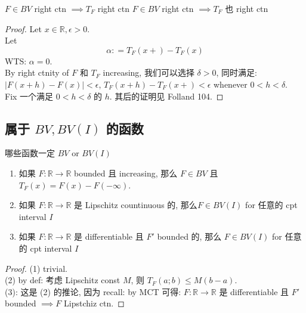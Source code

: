 \documentclass[lang=cn,11pt]{elegantbook}
\begin{document}
\begin{lemma}{$F\in BV$ right ctn $\implies T_F$ right ctn}
$F\in BV$ right ctn $\implies T_F$ 也 right ctn
\end{lemma}
\begin{proof}
Let $x\in \mathbb{R}, \epsilon > 0$.\\
Let \[
\alpha : = T_F(x+) - T_F(x)
\]WTS: $\alpha = 0$.\\
By right ctnity of $F$ 和 $T_F$ increasing, 我们可以选择 $\delta > 0$, 同时满足: $|F(x+ h) - F(x)|<\epsilon$, $T_F(x+h) - T_F(x+) < \epsilon$ whenever $0<h<\delta$.\\
Fix 一个满足 $0<h<\delta$ 的 $h$. 其后的证明见 Folland 104.
\end{proof}




\subsection{属于 $BV,BV(I)$ 的函数 }

\begin{lemma}{哪些函数一定 $BV$ or $BV(I)$}
\begin{enumerate}
    \item 如果 $F:\mathbb{R}\to \mathbb{R}$  bounded 且 increasing, 那么  $F \in BV$ 且 $T_F(x) = F(x) - F(-\infty)$.\\
    \item 如果 $F: \mathbb{R} \to \mathbb{R}$  是 Lipschitz countinuous 的, 那么$F \in BV(I)$ for 任意的 cpt interval $I$
    \item 如果 $F: \mathbb{R} \to \mathbb{R}$  是 differentiable 且 $F'$ bounded 的, 那么 $F \in BV(I)$ for 任意的 cpt interval $I$
\end{enumerate}
\end{lemma}
\begin{proof}
(1) trivial.\\
(2) by def: 考虑 Lipschitz const $M$, 则 $T_F(a;b) \leq M (b-a)$.\\
(3): 这是 (2) 的推论, 因为 recall: by MCT 可得: $F: \mathbb{R} \to \mathbb{R}$  是 differentiable 且 $F'$ bounded $\implies F$ Lipstchiz ctn.
\end{proof}
\end{document}
